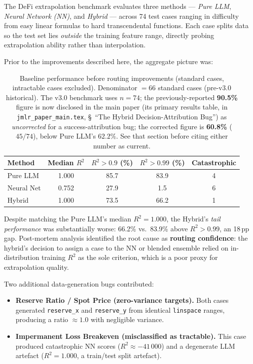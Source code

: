 \documentclass[twoside,11pt]{article}
\begin{document}
The DeFi extrapolation benchmark evaluates three methods --- \emph{Pure LLM},
\emph{Neural Network (NN)}, and \emph{Hybrid} --- across 74 test cases ranging
in difficulty from easy linear formulas to hard transcendental functions.
Each case splits data so the test set lies \emph{outside} the training feature
range, directly probing extrapolation ability rather than interpolation.

Prior to the improvements described here, the aggregate picture was:

\begin{table}[h]
\centering
\caption{Baseline performance before routing improvements (standard cases,
         intractable cases excluded). Denominator $= 66$ standard cases
         (pre-v3.0 historical). The v3.0 benchmark uses $n=74$; the
         previously-reported \textbf{90.5\%} figure is now disclosed in the
         main paper (its primary results table, in
         \texttt{jmlr\_paper\_main.tex}, \S~``The Hybrid
         Decision-Attribution Bug'') as \emph{uncorrected} for a
         success-attribution bug; the corrected figure is
         \textbf{60.8\%} ($45/74$), below Pure LLM's $62.2\%$. See that
         section before citing either number as current.}
\label{tab:baseline}
\begin{tabular}{lcccc}
\toprule
Method & Median $R^2$ & $R^2 > 0.9$ (\%) & $R^2 > 0.99$ (\%) & Catastrophic \\
\midrule
Pure LLM    & 1.000 & 85.7 & 83.9 & 4 \\
Neural Net  & 0.752 & 27.9 &  1.5 & 6 \\
Hybrid      & 1.000 & 73.5 & 66.2 & 1 \\
\bottomrule
\end{tabular}
\end{table}

Despite matching the Pure LLM's median $R^2 = 1.000$, the Hybrid's
\emph{tail performance} was substantially worse: 66.2\% vs.\ 83.9\% above
$R^2 > 0.99$, an 18\,pp gap.  Post-mortem analysis identified the root cause
as \textbf{routing confidence}: the hybrid's decision to assign a case to the
NN or blended ensemble relied on in-distribution training $R^2$ as the sole
criterion, which is a poor proxy for extrapolation quality.

Two additional data-generation bugs contributed:

\begin{itemize}[leftmargin=*]
  \item \textbf{Reserve Ratio / Spot Price (zero-variance targets).}
    Both cases generated \texttt{reserve\_x} and \texttt{reserve\_y} from
    identical \texttt{linspace} ranges, producing a ratio $\approx 1.0$ with
    negligible variance.
  \item \textbf{Impermanent Loss Breakeven (misclassified as tractable).}
    This case produced catastrophic NN scores ($R^2 \approx -41\,000$) and a
    degenerate LLM artefact ($R^2 = 1.000$, a train/test split artefact).
\end{itemize}
\end{document}

